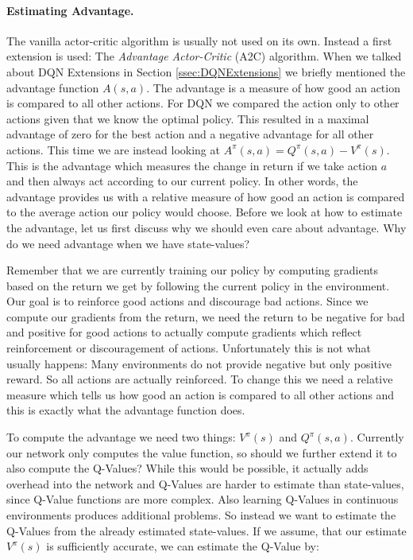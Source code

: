 \paragraph{Estimating Advantage.}
The vanilla actor-critic algorithm is usually not used on its own. Instead a first extension is used: The \textit{Advantage Actor-Critic} (A2C) algorithm. When we talked about DQN Extensions in Section \ref{ssec:DQNExtensions} we briefly mentioned the advantage function $A(s, a)$. The advantage is a measure of how good an action is compared to all other actions. For DQN we compared the action only to other actions given that we know the optimal policy. This resulted in a maximal advantage of zero for the best action and a negative advantage for all other actions. This time we are instead looking at $A^\pi(s, a) = Q^\pi(s, a) - V^\pi(s)$. This is the advantage which measures the change in return if we take action $a$ and then always act according to our current policy. In other words, the advantage provides us with a relative measure of how good an action is compared to the average action our policy would choose. Before we look at how to estimate the advantage, let us first discuss why we should even care about advantage. Why do we need advantage when we have state-values?

Remember that we are currently training our policy by computing gradients based on the return we get by following the current policy in the environment. Our goal is to reinforce good actions and discourage bad actions. Since we compute our gradients from the return, we need the return to be negative for bad and positive for good actions to actually compute gradients which reflect reinforcement or discouragement of actions. Unfortunately this is not what usually happens: Many environments do not provide negative but only positive reward. So all actions are actually reinforced. To change this we need a relative measure which tells us how good an action is compared to all other actions and this is exactly what the advantage function does. 

To compute the advantage we need two things: $V^\pi(s)$ and $Q^\pi(s, a)$. Currently our network only computes the value function, so should we further extend it to also compute the Q-Values? While this would be possible, it actually adds overhead into the network and Q-Values are harder to estimate than state-values, since Q-Value functions are more complex. Also learning Q-Values in continuous environments produces additional problems. So instead we want to estimate the Q-Values from the already estimated state-values. If we assume, that our estimate $V^\pi(s)$ is sufficiently accurate, we can estimate the Q-Value by:

